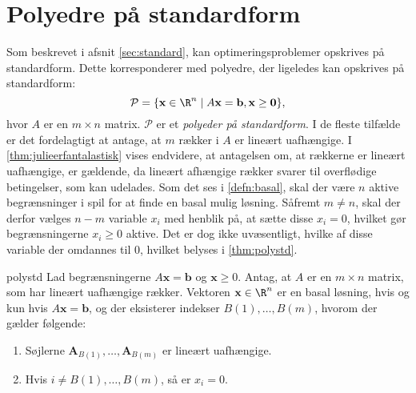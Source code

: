 \section{Polyedre på standardform}
\label{afsnit:fisk}
%
Som beskrevet i afsnit \ref{sec:standard}, kan optimeringsproblemer opskrives på standardform.
Dette korresponderer med polyedre, der ligeledes kan opskrives på standardform: 
$$\mathcal{P}=\{ \mathbf{x} \in \R^n  \mid  A\mathbf{x}=\mathbf{b}, \mathbf{x} \geq \mathbf{0} \},$$ hvor $A$ er en $m \times n$ matrix.
$\mathcal{P}$ er et \textit{polyeder på standardform}.
I de fleste tilfælde er det fordelagtigt at antage, at $m$ rækker i $A$ er lineært uafhængige.
I \ref{thm:julieerfantalastisk} vises endvidere, at antagelsen om, at rækkerne er lineært uafhængige, er gældende, da lineært afhængige rækker svarer til overflødige betingelser, som kan udelades.
Som det ses i \ref{defn:basal}, skal der være $n$ aktive begrænsninger i spil for at finde en basal mulig løsning.
Såfremt $m \neq n$, skal der derfor vælges $n-m$ variable $x_i$ med henblik på, at sætte disse $x_i=0$, hvilket gør begrænsningerne $x_i \geq 0$ aktive.
Det er dog ikke uvæsentligt, hvilke af disse variable der omdannes til $0$, hvilket belyses i \ref{thm:polystd}.
%
\begin{thm}{}{polystd}
Lad begrænsningerne $A\textbf{x}=\mathbf{b}$ og $\textbf{x}\geq 0$.
Antag, at $A$ er en $m \times n$ matrix, som har lineært uafhængige rækker.
Vektoren $\textbf{x} \in \R^n$ er en basal løsning, hvis og kun hvis $A\textbf{x}=\mathbf{b}$, og der eksisterer indekser $B(1),\ldots,B(m)$, hvorom der gælder følgende:
\begin{enumerate}[label=(\alph*)]
\item Søjlerne $\mathbf{A}_{B(1)},\ldots,\mathbf{A}_{B(m)}$ er lineært uafhængige.
\item Hvis $i \neq B(1),\ldots, B(m)$, så er $x_i=0$.
\end{enumerate}
\end{thm}
